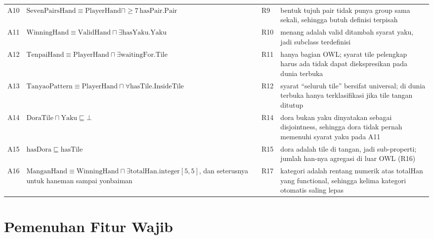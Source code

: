 \documentclass[11pt,a4paper]{article}
\begin{document}
{\begin{longtable}{@{}p{0.8cm} >{\raggedright\arraybackslash}p{6.9cm} p{1.6cm} >{\raggedright\arraybackslash}p{4.6cm}@{}}
A10 & $\mathrm{SevenPairsHand} \equiv \mathrm{PlayerHand} \sqcap {\geq}7\,\mathrm{hasPair}.\mathrm{Pair}$ & R9 & bentuk tujuh pair tidak punya group sama sekali, sehingga butuh definisi terpisah \\
A11 & $\mathrm{WinningHand} \equiv \mathrm{ValidHand} \sqcap \exists \mathrm{hasYaku}.\mathrm{Yaku}$ & R10 & menang adalah valid ditambah syarat yaku, jadi subclass terdefinisi \\
A12 & $\mathrm{TenpaiHand} \equiv \mathrm{PlayerHand} \sqcap \exists \mathrm{waitingFor}.\mathrm{Tile}$ & R11 & hanya bagian OWL; syarat tile pelengkap harus ada tidak dapat diekspresikan pada dunia terbuka \\
A13 & $\mathrm{TanyaoPattern} \equiv \mathrm{PlayerHand} \sqcap \forall \mathrm{hasTile}.\mathrm{InsideTile}$ & R12 & syarat ``seluruh tile'' bersifat universal; di dunia terbuka hanya terklasifikasi jika tile tangan ditutup \\
A14 & $\mathrm{DoraTile} \sqcap \mathrm{Yaku} \sqsubseteq \bot$ & R14 & dora bukan yaku dinyatakan sebagai disjointness, sehingga dora tidak pernah memenuhi syarat yaku pada A11 \\
A15 & $\mathrm{hasDora} \sqsubseteq \mathrm{hasTile}$ & R15 & dora adalah tile di tangan, jadi sub-properti; jumlah han-nya agregasi di luar OWL (R16) \\
A16 & $\mathrm{ManganHand} \equiv \mathrm{WinningHand} \sqcap \exists \mathrm{totalHan}.\mathrm{integer}[5,5]$, dan seterusnya untuk haneman sampai yonbaiman & R17 & kategori adalah rentang numerik atas totalHan yang functional, sehingga kelima kategori otomatis saling lepas \\
\midrule
\bottomrule
\end{longtable}
}

\section{Pemenuhan Fitur Wajib}
\end{document}
